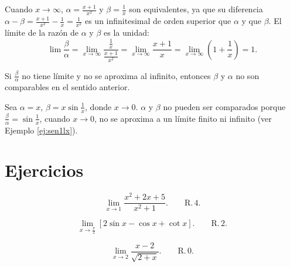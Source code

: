 \begin{example}
  Cuando \( x \to \infty \), \( \alpha = \frac{x + 1}{x^2} \) y \( \beta = \frac{1}{x} \) son equivalentes, ya que su diferencia \( \alpha - \beta = \frac{x + 1}{x^2} - \frac{1}{x} = \frac{1}{x^2}\) es un infinitesimal de orden superior que \( \alpha \) y que \( \beta \). El límite de la razón de \( \alpha \) y \( \beta \) es la unidad:
  \[
  \lim \frac{\beta}{\alpha} = \lim_{x \to \infty} \frac{\frac{1}{x}}{\frac{x + 1}{x^2}} = \lim_{x \to \infty} \frac{x + 1}{x} = \lim_{x \to \infty} \left( 1 + \frac{1}{x} \right) = 1.
  \]
\end{example}


\begin{remark}
  Si \( \frac{\beta}{\alpha} \) no tiene límite y no se aproxima al infinito, entonces \( \beta \) y \( \alpha \) no son comparables en el sentido anterior.
\end{remark}


\begin{example}
  Sea \( \alpha = x \), \( \beta = x \sin \frac{1}{x} \), donde \( x \to 0 \). \( \alpha \) y \( \beta \) no pueden ser comparados porque \( \frac{\beta}{\alpha} = \sin \frac{1}{x} \), cuando \( x \to 0 \), no se aproxima a un límite finito ni infinito (ver Ejemplo \ref{ej:sen1lx}).
\end{example}




\section*{Ejercicios}

\begin{exercise}
  \[
  \lim_{x \to 1} \frac{x^2 + 2x + 5}{x^2 + 1}.
  \qquad \text{R.} \, 4.
  \]
\end{exercise}


\begin{exercise}
  \[
  \lim_{x \to \frac{\pi}{2}} [ 2\sin x - \cos x + \cot x].
  \qquad \text{R.} \, 2.
  \]
\end{exercise}


\begin{exercise}
  \[
  \lim_{x \to 2} \frac{x - 2}{\sqrt{2 + x}}.
  \qquad \text{R.} \, 0.
  \]
\end{exercise}
























